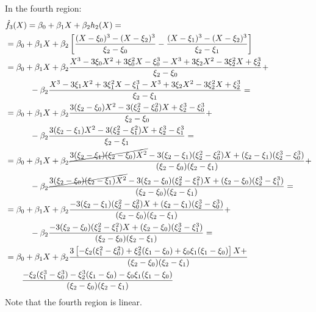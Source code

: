 \documentclass[12pt, letterpaper]{article}
\theoremstyle{definition}
\begin{document}
In the fourth region:
\begin{equation}
\begin{aligned}
&\hat{f}_3(X) = \beta_0 + \beta_1 X  +\beta_2 h_2(X) =\\
&= \beta_0 + \beta_1 X  +\beta_2\left[ \frac{(X-\xi_0)^3-(X-\xi_2)^3}{\xi_2 - \xi_0} - \frac{(X-\xi_1)^3-(X-\xi_2)^3}{\xi_2 - \xi_1}\right]  \\
&= \beta_0 + \beta_1 X +\beta_2 \frac{X^3 -3 \xi_0 X^2 + 3\xi_0^2 X-\xi_0^3-X^3 +3 \xi_2 X^2 - 3\xi_2^2 X+\xi_2^3}{\xi_2 - \xi_0} +\\
&\quad\quad\quad -\beta_2  \frac{X^3 -3 \xi_1 X^2 + 3\xi_1^2 X-\xi_1^3-X^3 +3 \xi_2 X^2 - 3\xi_2^2 X+\xi_2^3}{\xi_2 - \xi_1} =\\
&= \beta_0 + \beta_1 X +\beta_2 \frac{ 3 (\xi_2-\xi_0) X^2 - 3(\xi_2^2- \xi_0^2) X+\xi_2^3-\xi_0^3}{\xi_2 - \xi_0} +\\
&\quad\quad\quad -\beta_2         \frac{3 (\xi_2-\xi_1 ) X^2 - 3(\xi_2^2 - \xi_1^2) X+\xi_2^3-\xi_1^3  }{\xi_2 - \xi_1} =\\
&= \beta_0 + \beta_1 X +\beta_2 \frac{ \cancel{3(\xi_2 - \xi_1) (\xi_2-\xi_0) X^2} - 3(\xi_2 - \xi_1)(\xi_2^2- \xi_0^2) X+(\xi_2 - \xi_1)(\xi_2^3-\xi_0^3)}{(\xi_2 - \xi_0)(\xi_2 - \xi_1)} +\\
&\quad\quad\quad -\beta_2         \frac{\cancel{3 (\xi_2 - \xi_0)(\xi_2-\xi_1 ) X^2} - 3(\xi_2 - \xi_0)(\xi_2^2 - \xi_1^2) X+(\xi_2 - \xi_0)(\xi_2^3-\xi_1^3  )}{(\xi_2 - \xi_0)(\xi_2 - \xi_1)} =\\
&= \beta_0 + \beta_1 X +\beta_2 \frac{- 3(\xi_2 - \xi_1)(\xi_2^2- \xi_0^2) X+(\xi_2 - \xi_1)(\xi_2^3-\xi_0^3)}{(\xi_2 - \xi_0)(\xi_2 - \xi_1)} +\\
&\quad\quad\quad -\beta_2         \frac{- 3(\xi_2 - \xi_0)(\xi_2^2 - \xi_1^2) X+(\xi_2 - \xi_0)(\xi_2^3-\xi_1^3  )}{(\xi_2 - \xi_0)(\xi_2 - \xi_1)} =\\
&= \beta_0 + \beta_1 X +\beta_2 \frac{3\left[-\xi_2(\xi_1^2-\xi_0^2)+\xi_2^2(\xi_1-\xi_0)+\xi_0\xi_1(\xi_1-\xi_0)\right]X+}{(\xi_2 - \xi_0)(\xi_2 - \xi_1)}\\
&\quad\quad \frac{-\xi_2(\xi_1^3-\xi_0^3)-\xi_2^3(\xi_1-\xi_0)-\xi_0\xi_1(\xi_1-\xi_0)}{(\xi_2 - \xi_0)(\xi_2 - \xi_1)}
\end{aligned}
\end{equation}
Note that the fourth region is linear.
\end{document}
